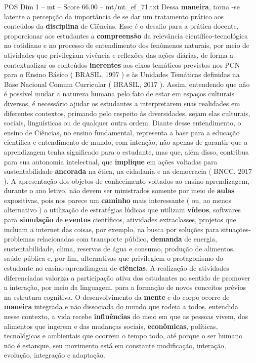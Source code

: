 \begin{textsample}{POS Dim 1 – mt – Score 66.00 – mt/mt\_ef\_71.txt}
Dessa \textbf{maneira}, torna -se latente a percepção da importância de se dar um tratamento prático aos conteúdos da \textbf{disciplina} de Ciências.
Esse é o desafio para a prática docente, proporcionar aos estudantes a \textbf{compreensão} da relevância científico-tecnológica no cotidiano e no processo de entendimento dos fenômenos naturais, por meio de atividades que privilegiam vivência e reflexões das ações diárias, de forma a contextualizar os conteúdos \textbf{inerentes} aos eixos temáticos previstos nos PCN para o Ensino Básico ( BRASIL, 1997 ) e às Unidades Temáticas definidas na Base Nacional Comum Curricular ( BRASIL, 2017 ).
Assim, entendendo que não é possível mudar a natureza humana pelo fato de estar em espaços culturais diversos, é necessário ajudar os estudantes a interpretarem suas realidades em diferentes contextos, primando pelo respeito às diversidades, sejam elas culturais, sociais, linguísticas ou de qualquer outra ordem.
Diante desse entendimento, o ensino de Ciências, no ensino fundamental, representa a base para a educação científica e entendimento de mundo, com intenção, não apenas de garantir que a aprendizagem tenha significado para o estudante, mas que, além disso, contribua para sua autonomia intelectual, que \textbf{implique} em ações voltadas para sustentabilidade \textbf{ancorada} na ética, na cidadania e na democracia ( BNCC, 2017 ).
A apresentação dos objetos de conhecimento voltados ao ensino-aprendizagem, durante o ano letivo, não devem ser ministrados somente por meio de \textbf{aulas} expositivas, pois nos parece um \textbf{caminho} mais interessante ( ou, ao menos alternativo ) a utilização de estratégias lúdicas que utilizam \textbf{vídeos}, softwares para \textbf{simulação} de \textbf{eventos} científicos, atividades extraclasses, projetos que incluam a internet das coisas, por exemplo, na busca por soluções para situações-problemas relacionadas com transporte público, \textbf{demanda} de energia, sustentabilidade, clima, reservas de água e consumo, produção de alimentos, saúde pública e, por fim, alternativas que privilegiem o protagonismo do estudante no ensino-aprendizagem de \textbf{ciências}.
A realização de atividades diferenciadas valoriza a participação ativa dos estudantes no sentido de promover a interação, por meio da linguagem, para a formação de novos conceitos prévios na estrutura cognitiva.
O desenvolvimento da \textbf{mente} e do corpo ocorre de \textbf{maneira} integrada e não dissociada do mundo que rodeia a todos, entendida nesse contexto, a vida recebe \textbf{influências} do meio em que as pessoas vivem, dos alimentos que ingerem e das mudanças sociais, \textbf{econômicas}, políticas, tecnológicas e ambientais que ocorrem o tempo todo, até porque o ser humano não é estanque, seu movimento está em constante modificação, interação, evolução, integração e adaptação.

\end{textsample}

